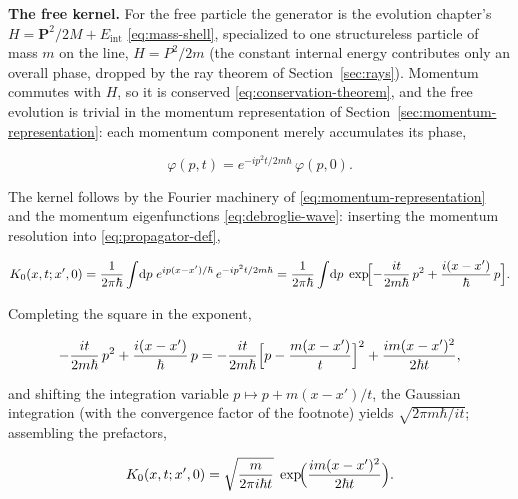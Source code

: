 \medskip\noindent\textbf{The free kernel.} For the free particle the generator is the evolution chapter's $H = \bm P^2/2M + E_{\mathrm{int}}$ \eqref{eq:mass-shell}, specialized to one structureless particle of mass $m$ on the line, $H = P^2/2m$ (the constant internal energy contributes only an overall phase, dropped by the ray theorem of Section~\ref{sec:rays}). Momentum commutes with $H$, so it is conserved \eqref{eq:conservation-theorem}, and the free evolution is trivial in the momentum representation of Section~\ref{sec:momentum-representation}: each momentum component merely accumulates its phase,
\begin{linenomath}
    \begin{equation*}
        \varphi(p, t) = e^{-ip^2 t/2m\hbar}\,\varphi(p, 0) .
    \end{equation*}
\end{linenomath}
The kernel follows by the Fourier machinery of \eqref{eq:momentum-representation} and the momentum eigenfunctions \eqref{eq:debroglie-wave}: inserting the momentum resolution into \eqref{eq:propagator-def},
\begin{linenomath}
    \begin{equation}
        K_0(x, t; x', 0)
        = \frac{1}{2\pi\hbar}\int\!\mathrm{d} p\; e^{ip(x-x')/\hbar}\,e^{-ip^2 t/2m\hbar}
        = \frac{1}{2\pi\hbar}\int\!\mathrm{d} p\; \exp\!\Bigl[-\frac{it}{2m\hbar}\,p^2 + \frac{i(x-x')}{\hbar}\,p\Bigr] .
    \end{equation}
\end{linenomath}
Completing the square in the exponent,
\begin{linenomath}
    \begin{equation*}
        -\frac{it}{2m\hbar}\,p^2 + \frac{i(x-x')}{\hbar}\,p
        = -\frac{it}{2m\hbar}\Bigl[p - \frac{m(x-x')}{t}\Bigr]^2
        + \frac{im(x-x')^2}{2\hbar t} ,
    \end{equation*}
\end{linenomath}
and shifting the integration variable $p \mapsto p + m(x-x')/t$, the Gaussian integration (with the convergence factor of the footnote) yields $\sqrt{2\pi m\hbar/it}$; assembling the prefactors,
\begin{linenomath}
    \begin{equation}
        K_0(x, t; x', 0)
        = \sqrt{\frac{m}{2\pi i\hbar t}}\;\exp\!\Bigl(\frac{im(x-x')^2}{2\hbar t}\Bigr) .
        \label{eq:free-propagator}
    \end{equation}
\end{linenomath}
